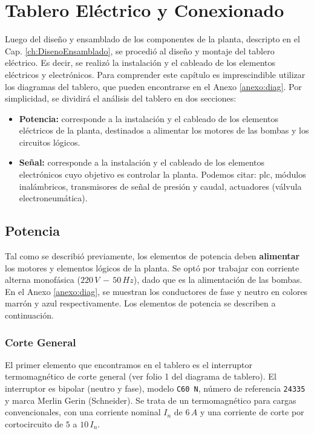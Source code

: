 \chapter{Tablero Eléctrico y Conexionado}
\label{ch:tablero}

Luego del diseño y ensamblado de los componentes de la planta, descripto en el
Cap.
\ref{ch:DisenoEnsamblado}, se procedió al diseño y montaje del
tablero eléctrico.
Es decir, se realizó la instalación y el cableado de los elementos eléctricos y
electrónicos.
Para comprender este capítulo es imprescindible utilizar los diagramas
del tablero, que pueden encontrarse en el Anexo \ref{anexo:diag}.
Por simplicidad, se dividirá el análisis del tablero en dos secciones:
\begin{itemize}
 \item \textbf{Potencia:} corresponde a la instalación y el cableado
 de los elementos eléctricos de la planta, destinados a alimentar los motores de
 las bombas y los circuitos lógicos.
 \item \textbf{Señal:} corresponde a la instalación y el cableado
 de los elementos electrónicos cuyo objetivo es controlar la planta.
 Podemos citar: \gls{plc}, módulos inalámbricos,
 transmisores de señal de presión y caudal, actuadores (válvula electroneumática).
\end{itemize}

\section{Potencia}
\label{sec:Potencia}
Tal como se describió previamente, los elementos de potencia deben
\textbf{alimentar} los motores y elementos lógicos de la planta.
Se optó por trabajar con corriente alterna monofásica ($220\,V\,-\,50\,Hz$),
dado que es la alimentación de las bombas.
En el Anexo \ref{anexo:diag}, se muestran los conductores de fase y neutro en
colores marrón y azul respectivamente.
Los elementos de potencia se describen a continuación.

\subsection{Corte General}
\label{subsec:corteGeneral}
El primer elemento que encontramos en el tablero es el interruptor
termomagnético de corte general (ver folio 1 del diagrama de tablero).
El interruptor es bipolar (neutro y fase), modelo \verb|C60 N|, número de
referencia \verb|24335| y marca Merlin Gerin (Schneider).
Se trata de un termomagnético para cargas convencionales, con una corriente
nominal $I_n$ de $6\,A$ y una corriente de corte por cortocircuito de $5$ a
$10\,I_n$.

